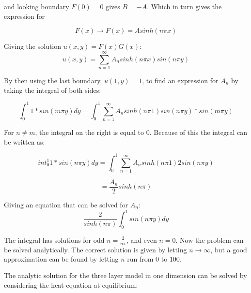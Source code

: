 \documentclass[10pt,a4paper]{article}
\begin{document}
\noindent and looking boundary $F(0)=0$ gives $B=-A$. Which in turn gives the expression for 

\begin{equation}
F(x) \rightarrow F(x)=Asinh(n\pi x)
\end{equation}

\noindent Giving the solution $u(x,y)=F(x)G(x)$:\\

\begin{equation}
u(x,y)=\sum^\infty_{n=1}A_nsinh(n\pi x)sin(n\pi y)
\end{equation}

\noindent By then using the last boundary, $u(1,y)=1$, to find an expression for $A_n$ by taking the integral of both sides: 


\begin{equation}
\int_0^1 1*sin(m\pi y) dy = \int_0^1 \sum^\infty_{n=1}A_nsinh(n\pi 1)sin(n\pi y)*sin(m\pi y)
\end{equation}

\noindent For $n\neq m$, the integral on the right is equal to 0. Because of this the integral can be written as:


\begin{equation}
int_0^1 1*sin(n\pi y) dy = \int_0^1 \sum^\infty_{n=1}A_nsinh(n\pi 1)2sin(n\pi y)
\end{equation}

\begin{equation}
= \frac{A_n}{2}sinh(n\pi) 
\end{equation}

\noindent Giving an equation that can be solved for $A_n$:\\

\begin{equation}
\frac{2}{sinh(n\pi)}\int_0^1sin(n\pi y) dy
\end{equation}

The integral has solutions for odd $n = \frac{2}{n\pi}$, and even $n = 0$. Now the problem can be solved analytically. The correct solution is given by letting $n \rightarrow \infty$, but a good approximation can be found by letting $n$ run from $0$ to $100$. 










\noindent The analytic solution for the three layer model in one dimension can be solved by considering the heat equation at equilibrium:\\
\end{document}
